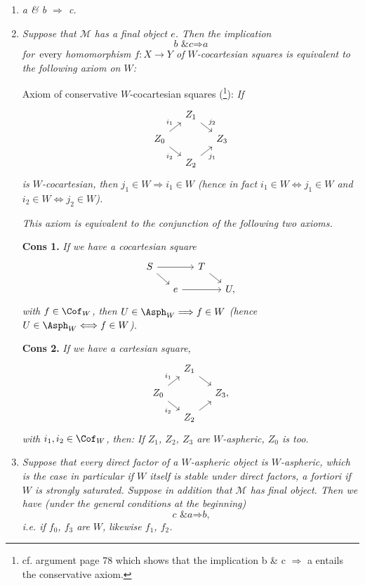 \begin{enumerate}
\item[\textit{1°)}] \textit{a \& b $\Longrightarrow$ c.}


\item[\textit{2°)}] \textit{Suppose that $\mathcal{M}$ has a final object $e$. Then the implication}
\[
\textit{b \& c} \Longrightarrow \textit{a}
\]
\textit{for}~every \textit{homomorphism $f : X \longrightarrow Y$ of $W$-cocartesian squares is equivalent to the following axiom on $W$:}

Axiom of conservative $W$-cocartesian squares (\footnote{cf. argument page 78 which shows that the implication b \& c $\Longrightarrow$ a entails the conservative axiom.}): \textit{If}
\[
\begin{tikzcd}[ampersand replacement=\&, column sep=small, row sep=small]
 \& Z_1 \arrow[dr, "j_2"] \& \\
Z_0 \arrow[ur, "i_1"] \arrow[dr, "i_2"'] \& \& Z_3 \\
 \& Z_2 \arrow[ur, "j_1"'] \&
\end{tikzcd}
\]
\textit{is $W$-cocartesian, then $j_1 \in W \Longrightarrow i_1 \in W$ (hence in fact $i_1 \in W \Longleftrightarrow j_1 \in W$ and $i_2 \in W \Longleftrightarrow j_2 \in W$).}

\textit{This axiom is equivalent to the conjunction of the following two axioms.}

\textbf{Cons 1.} \textit{If we have a cocartesian square}
\[
\begin{tikzcd}[ampersand replacement=\&, column sep=small, row sep=small]
S \arrow[rr] \arrow[dr] \& \& T \arrow[dr] \& \\
 \& e \arrow[rr] \& \& U,
\end{tikzcd}
\]
\textit{with $f \in \Cof_W$, then $U \in \Asph_W \Longrightarrow f \in W$ (hence $U \in \Asph_W \Longleftrightarrow f \in W$).}

\textbf{Cons 2.} \textit{If we have a cartesian square,}
\[
\begin{tikzcd}[ampersand replacement=\&, column sep=small, row sep=small]
 \& Z_1 \arrow[dr] \& \\
Z_0 \arrow[ur, "i_1"] \arrow[dr, "i_2"'] \& \& Z_3, \\
 \& Z_2 \arrow[ur] \&
\end{tikzcd}
\]
\textit{with $i_1, i_2 \in \Cof_W$, then: If $Z_1$, $Z_2$, $Z_3$ are $W$-aspheric, $Z_0$ is too.}


\item[\textit{3°)}] \textit{Suppose that every direct factor of a $W$-aspheric object is $W$-aspheric, which is the case in particular if $W$ itself is stable under direct factors, a fortiori if $W$ is strongly saturated. Suppose in addition that $\mathcal{M}$ has} \textit{final object. Then we have (under the general conditions at the beginning)}
\[
\textit{c \& a} \Longrightarrow \textit{b,}
\]
\textit{i.e. if $f_0$, $f_3$ are} \textit{$W$, likewise $f_1$, $f_2$.}
\end{enumerate}

